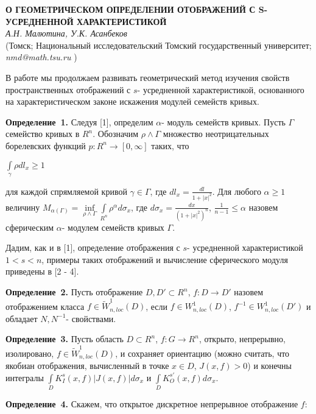 \begin{center}{ \bf  О ГЕОМЕТРИЧЕСКОМ ОПРЕДЕЛЕНИИ ОТОБРАЖЕНИЙ С S- УСРЕДНЕННОЙ ХАРАКТЕРИСТИКОЙ}\\
{\it А.Н. Малютина, У.К. Асанбеков } \\
(Томск; Национальный исследовательский Томский государственный университет; {\it nmd@math.tsu.ru} )
\end{center}


В работе мы продолжаем развивать геометрический метод изучения свойств пространственных отображений с $s$- усредненной характеристикой, основанного на характеристическом законе искажения модулей семейств кривых.

\textbf{Определение~1.} Следуя [1], определим $\alpha$- модуль семейств кривых. Пусть $\Gamma$ семейство кривых в $R^{n}$. Обозначим $\rho\wedge\Gamma$ множество неотрицательных борелевских функций $p:R^{n}\rightarrow[0,\infty]$ таких, что
\begin{center}
	$\int\limits_{\gamma}\rho dl_{x}\geqslant1$
\end{center}

для каждой спрямляемой кривой $\gamma\in\Gamma$, где $dl_{x}=\frac{dl}{1+|x|^{2}}$. Для любого $\alpha\geqslant1$ величину	 $M_{\alpha(\Gamma)}=\inf\limits_{\rho\wedge\Gamma}\int\limits_{R^{n}}\rho^{\alpha}d\sigma_{x}$, где $d\sigma_{x}=\frac{dx}{(1+|x|^{2})^{n}}$, $\frac{1}{n-1}\leqslant\alpha$ назовем сферическим $\alpha$- модулем семейств кривых $\Gamma$.


Дадим, как и в [1], определение отображения с $s$- усредненной характеристикой $1<s<n$, примеры таких отображений и вычисление сферического модуля приведены в [2 - 4].

\textbf{Определение~2.} Пусть отображение $D, D'\subset R^{n}$, $f:D\rightarrow D'$ назовем отображением класса $f\in\tilde{W}^{1}_{n,loc}(D)$, если $f\in W^{1}_{n,loc}(D)$, $f^{-1}\in W^{1}_{n,loc}(D')$ и обладает $N,N^{-1}$- свойствами.


\textbf{Определение~3.} Пусть область $D\subset R^{n}$, $f:G\rightarrow R^{n}$, открыто, непрерывно, изолировано, $f\in\tilde{W}^{1}_{n,loc}(D)$, и сохраняет ориентацию (можно считать, что якобиан отображения, вычисленный в точке $x\in D$, $J(x,f)>0$) и конечны интегралы $\int\limits_{D}K_{I}^{s}(x,f)|J(x,f)|d\sigma_{x}$ и $\int\limits_{D}K_{O}^{s'}(x,f)d\sigma_{x}$.


\textbf{Определение~4.} Скажем, что открытое дискретное непрерывное отображение $f$:

